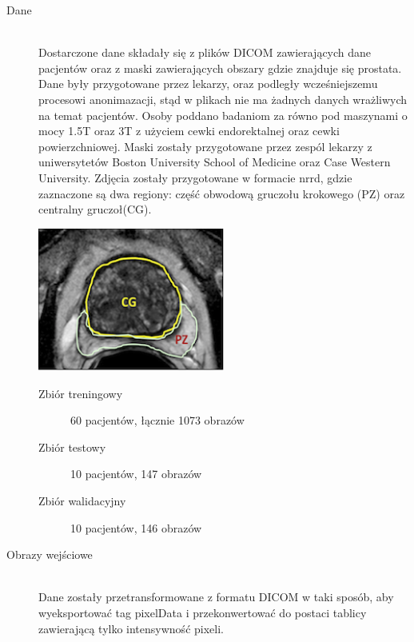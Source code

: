 \documentclass[a4paper,11pt,twoside]{report}
\theoremstyle{definition}
\begin{document}
\begin{description}
	\item [Dane] \hfill \\
	Dostarczone dane składały się z plików DICOM zawierających dane pacjentów oraz z maski zawierających obszary gdzie znajduje się prostata. Dane były przygotowane przez lekarzy, oraz podległy wcześniejszemu procesowi anonimazacji, stąd w plikach nie ma żadnych danych wrażliwych na temat pacjentów. Osoby poddano badaniom za równo pod maszynami o mocy 1.5T oraz 3T z użyciem cewki endorektalnej oraz cewki powierzchniowej. Maski zostały przygotowane  przez zespól lekarzy z uniwersytetów Boston University School of Medicine oraz Case Western University. Zdjęcia zostały przygotowane w formacie nrrd, gdzie zaznaczone są dwa regiony: część obwodową gruczołu krokowego (PZ) oraz centralny gruczoł(CG). 
	
	\begin{minipage}{\linewidth}
		\centering
		\includegraphics[width=0.5\textwidth]{segmentation/prostate_seg.png}
	\end{minipage}
	
	\begin{description}
		\item[Zbiór treningowy] 60 pacjentów, łącznie 1073 obrazów
		\item[Zbiór testowy] 10 pacjentów, 147 obrazów
		\item[Zbiór walidacyjny] 10 pacjentów, 146 obrazów
	\end{description}


	\item [Obrazy wejściowe] \hfill \\
	Dane zostały przetransformowane z formatu DICOM w taki sposób, aby wyeksportować tag pixelData i przekonwertować do postaci tablicy zawierającą tylko intensywność pixeli.
	

\end{description}
\end{document}
